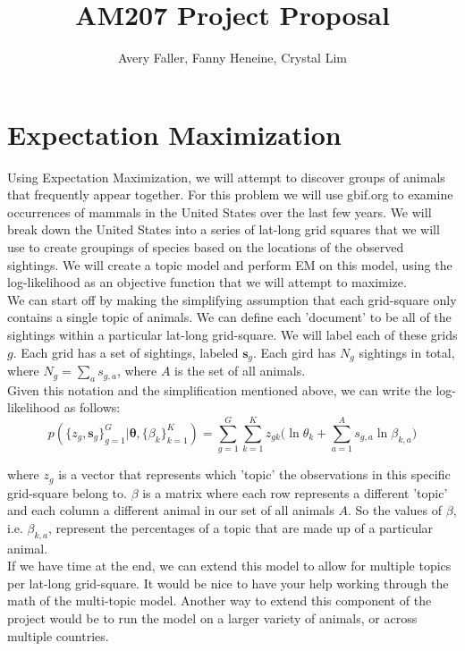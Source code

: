 \documentclass[12pt]{article}
\author{Avery Faller, Fanny Heneine, Crystal Lim}
\title{AM207 Project Proposal}
\begin{document}
\maketitle
\newpage
\section*{Expectation Maximization}
Using Expectation Maximization, we will attempt to discover groups of animals that frequently appear together.  For this problem we will use gbif.org to examine occurrences of mammals in the United States over the last few years.  We will break down the United States into a series of lat-long grid squares that we will use to create groupings of species based on the locations of the observed sightings.  We will create a topic model and perform EM on this model, using the log-likelihood as an objective function that we will attempt to maximize. \\

\noindent We can start off by making the simplifying assumption that each grid-square only contains a single topic of animals. We can define each 'document' to be all of the sightings within a particular lat-long grid-square.  We will label each of these grids $g$. Each grid has a set of sightings, labeled $\boldsymbol{s}_g$.  Each gird has $N_g$ sightings in total, where $N_g = \sum_a s_{g,a}$, where $A$ is the set of all animals. \\

\noindent Given this notation and the simplification mentioned above, we can write the log-likelihood as follows: \\

$$p(\{z_g,\boldsymbol{s}_g\}^G_{g=1} | \boldsymbol{\theta}, \{\beta_k\}^K_{k=1}) = \sum_{g=1}^G \sum_{k=1}^K z_{gk} \bigg( \ln \theta_k + \sum_{a=1}^A s_{g,a} \ln \beta_{k,a}  \bigg)$$

\noindent where $z_g$ is a vector that represents which 'topic' the observations in this specific grid-square belong to. $\beta$ is a matrix where each row represents a different 'topic' and each column a different animal in our set of all animals $A$. So the values of $\beta$, i.e. $\beta_{k, a}$, represent the percentages of a topic that are made up of a particular animal. \\

\noindent If we have time at the end, we can extend this model to allow for multiple topics per lat-long grid-square.  It would be nice to have your help working through the math of the multi-topic model. Another way to extend this component of the project would be to run the model on a larger variety of animals, or across multiple countries. \\
\end{document}
